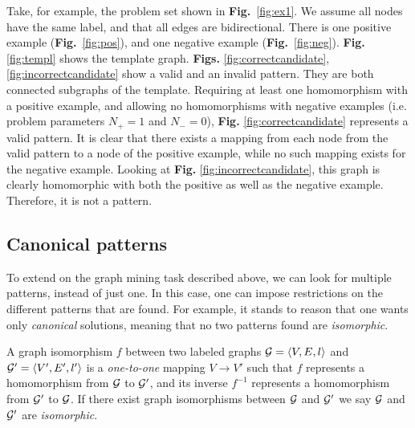 \vspace{-1em}
Take, for example, the problem set shown in \textbf{Fig.}~\ref{fig:ex1}. We assume all nodes have the same label, and that all edges are bidirectional.
There is one positive example (\textbf{Fig.}~\ref{fig:pos}), and one negative example (\textbf{Fig.}~\ref{fig:neg}). 
\textbf{Fig.} \ref{fig:templ} shows the template graph.
\textbf{Figs.} \ref{fig:correctcandidate}, \ref{fig:incorrectcandidate} show a valid and an invalid pattern. 
They are both connected subgraphs of the template.
Requiring at least one homomorphism with a positive example, and allowing no homomorphisms with negative examples (i.e. problem parameters $N_{+}=1$ and $N_{-}=0$), \textbf{Fig.} \ref{fig:correctcandidate} represents a valid pattern.
It is clear that there exists a mapping from each node from the valid pattern to a node of the positive example, while no such mapping exists for the negative example.
Looking at \textbf{Fig.} \ref{fig:incorrectcandidate}, this graph is clearly homomorphic with both the positive as well as the negative example. Therefore, it is not a pattern.

\subsection{Canonical patterns}
To extend on the graph mining task described above, we can look for multiple patterns, instead of just one.
In this case, one can impose restrictions on the different patterns that are found.
For example, it stands to reason that one wants only \emph{canonical} solutions, meaning that no two patterns found are \emph{isomorphic}.

\begin{definition}
\label{def:isomorphism}
A graph isomorphism $f$ between two labeled graphs $\mathcal{G} = \langle V,E,l \rangle$ and $\mathcal{G'} = \langle V',E',l' \rangle$ is a \emph{one-to-one} mapping $V \rightarrow V'$ 
such that $f$ represents a homomorphism from $\mathcal{G}$ to $\mathcal{G'}$,
and its inverse $f^{-1}$ represents a homomorphism from $\mathcal{G'}$ to $\mathcal{G}$.
If there exist graph isomorphisms between $\mathcal{G}$ and $\mathcal{G'}$ we say $\mathcal{G}$ and $\mathcal{G'}$ are \emph{isomorphic}.
\end{definition}


